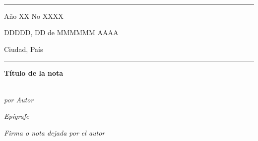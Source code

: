 \documentclass[letterpaper, 12pt]{article}
\begin{document}
\begin{center}
\\
\rule[0mm]{200mm}{0.2mm}
\vspace{-8mm}
\begin{multicols}{3}
\begin{flushleft}
Año XX No XXXX\\
\end{flushleft}
\begin{center}
DDDDD, DD de MMMMMM AAAA\\
\end{center}
\begin{flushright}
Ciudad, País
\end{flushright}
\end{multicols}
\vspace{-2mm}
\rule[10mm]{200mm}{0.5mm}
\end{center}

\vspace{-14mm}
\begin{center}
\begin{huge}
\textbf{Título de la nota}
\end{huge}
\\
\textit{por Autor}
\end{center}

\begin{multicols}{2}
\begin{flushleft}
\textit{Epígrafe} %
\end{flushleft}

\linenumbers
\modulolinenumbers[10] %
\lipsum[1-40]

\begin{flushright}
\textit{Firma o nota dejada por el autor} %
\end{flushright}
\end{multicols} 
\end{document}
